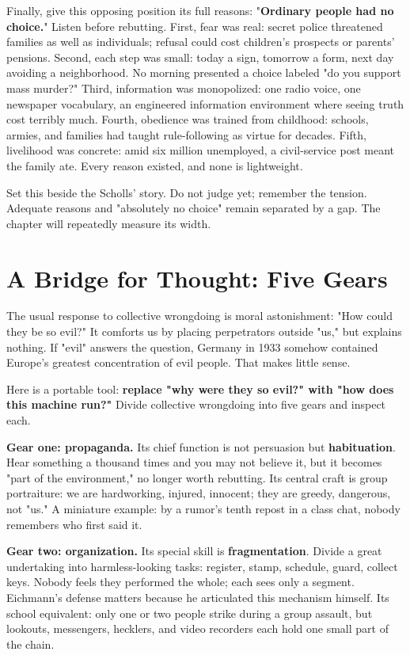 Finally, give this opposing position its full reasons: "\textbf{Ordinary people had no choice.}" Listen before rebutting. First, fear was real: secret police threatened families as well as individuals; refusal could cost children's prospects or parents' pensions. Second, each step was small: today a sign, tomorrow a form, next day avoiding a neighborhood. No morning presented a choice labeled "do you support mass murder?" Third, information was monopolized: one radio voice, one newspaper vocabulary, an engineered information environment where seeing truth cost terribly much. Fourth, obedience was trained from childhood: schools, armies, and families had taught rule-following as virtue for decades. Fifth, livelihood was concrete: amid six million unemployed, a civil-service post meant the family ate. Every reason existed, and none is lightweight.

Set this beside the Scholls' story. Do not judge yet; remember the tension. Adequate reasons and "absolutely no choice" remain separated by a gap. The chapter will repeatedly measure its width.

\section{A Bridge for Thought: Five Gears}
The usual response to collective wrongdoing is moral astonishment: "How could they be so evil?" It comforts us by placing perpetrators outside "us," but explains nothing. If "evil" answers the question, Germany in 1933 somehow contained Europe's greatest concentration of evil people. That makes little sense.

Here is a portable tool: \textbf{replace "why were they so evil?" with "how does this machine run?"} Divide collective wrongdoing into five gears and inspect each.

\textbf{Gear one: propaganda.} Its chief function is not persuasion but \textbf{habituation}. Hear something a thousand times and you may not believe it, but it becomes "part of the environment," no longer worth rebutting. Its central craft is group portraiture: we are hardworking, injured, innocent; they are greedy, dangerous, not "us." A miniature example: by a rumor's tenth repost in a class chat, nobody remembers who first said it.

\textbf{Gear two: organization.} Its special skill is \textbf{fragmentation}. Divide a great undertaking into harmless-looking tasks: register, stamp, schedule, guard, collect keys. Nobody feels they performed the whole; each sees only a segment. Eichmann's defense matters because he articulated this mechanism himself. Its school equivalent: only one or two people strike during a group assault, but lookouts, messengers, hecklers, and video recorders each hold one small part of the chain.

